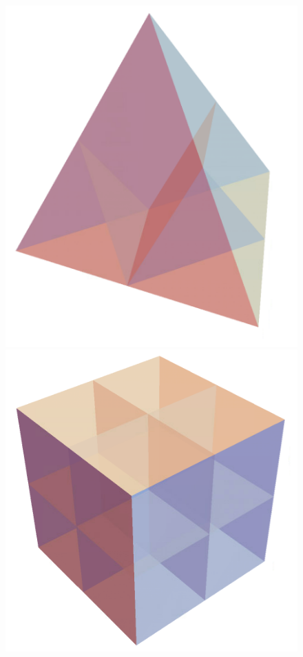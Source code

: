 \documentclass{amsart}
\theoremstyle{definition}
\begin{document}

\begin{figure}
	\centerline{
		\includegraphics[scale=.3]{diagonalSimplexGuillaume.png}
		\includegraphics[scale=.35]{diagonalCubeGuillaume.png}
}
\end{figure}
\end{document}
